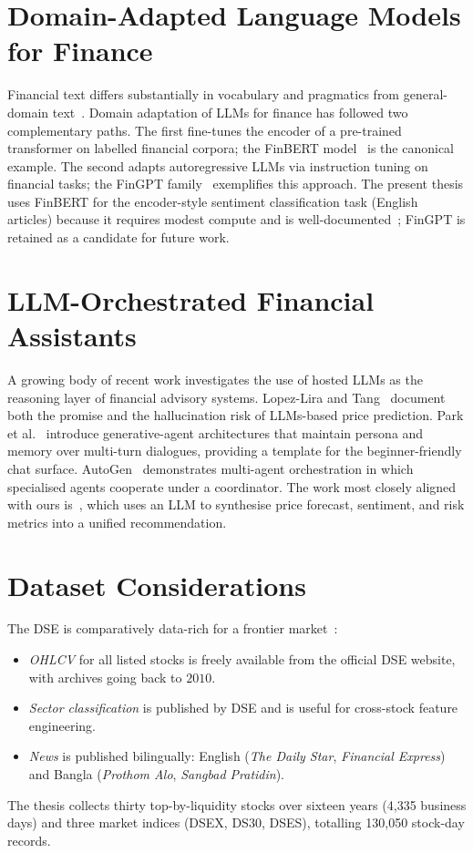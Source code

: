 \documentclass[12pt,a4paper,oneside]{report}
\begin{document}
\section{Domain-Adapted Language Models for Finance}

Financial text differs substantially in vocabulary and pragmatics
from general-domain text~\cite{araci2019finbert}. Domain adaptation
of \acp{LLM} for finance has followed two complementary paths.
The first fine-tunes the encoder of a pre-trained transformer on
labelled financial corpora; the FinBERT model~\cite{araci2019finbert}
is the canonical example. The second adapts autoregressive
\acp{LLM} via instruction tuning on financial tasks; the FinGPT
family~\cite{yang2023fingpt} exemplifies this approach. The present
thesis uses FinBERT for the encoder-style sentiment classification
task (English articles) because it requires modest compute and is
well-documented~\cite{araci2019finbert}; FinGPT is retained as a
candidate for future work.

\section{\ac{LLM}-Orchestrated Financial Assistants}

A growing body of recent work investigates the use of hosted
\acp{LLM} as the reasoning layer of financial advisory systems.
Lopez-Lira and Tang~\cite{lopez2023canchatgpt} document both the
promise and the hallucination risk of \acp{LLM}-based price
prediction. Park et al.~\cite{park2023generative} introduce
generative-agent architectures that maintain persona and memory
over multi-turn dialogues, providing a template for the
beginner-friendly chat surface. AutoGen~\cite{wu2023autogen}
demonstrates multi-agent orchestration in which specialised agents
cooperate under a coordinator. The work most closely aligned with
ours is~\cite{li2024llmfactor}, which uses an \ac{LLM} to synthesise
price forecast, sentiment, and risk metrics into a unified
recommendation.

\section{Dataset Considerations}

The DSE is comparatively data-rich for a frontier
market~\cite{tsay2010analysis}:
\begin{itemize}[leftmargin=*,itemsep=2pt]
  \item \emph{OHLCV} for all listed stocks is freely available
        from the official DSE website, with archives going back
        to $2010$.
  \item \emph{Sector classification} is published by DSE and is
        useful for cross-stock feature engineering.
  \item \emph{News} is published bilingually: English (\emph{The
        Daily Star}, \emph{Financial Express}) and Bangla
        (\emph{Prothom Alo}, \emph{Sangbad Pratidin}).
\end{itemize}
The thesis collects thirty top-by-liquidity stocks over sixteen
years (4{,}335 business days) and three market indices (DSEX, DS30,
DSES), totalling 130{,}050 stock-day records.
\end{document}
